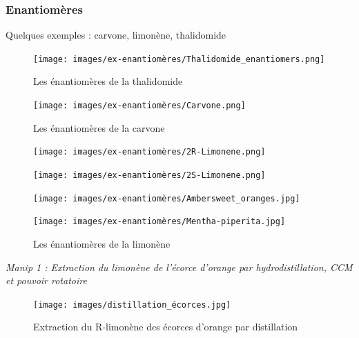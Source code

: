 \documentclass{article}%
\begin{document}
\subsubsection{Enantiomères}


Quelques exemples : carvone, limonène, thalidomide

\begin{figure}
	\centerline{\texttt{[image: images/ex-enantiomères/Thalidomide\_enantiomers.png]}}
	\caption{Les énantiomères de la thalidomide}
\end{figure}


\begin{figure}
	\centerline{\texttt{[image: images/ex-enantiomères/Carvone.png]}}
	\caption{Les énantiomères de la carvone}
\end{figure}


\begin{figure}
	\begin{minipage}[t]{0,5\textwidth}
		\texttt{[image: images/ex-enantiomères/2R-Limonene.png]}
\end{minipage}
	\begin{minipage}[t]{0,5\textwidth}
		\texttt{[image: images/ex-enantiomères/2S-Limonene.png]}
\end{minipage}

\begin{minipage}[t]{0,5\textwidth}
	\texttt{[image: images/ex-enantiomères/Ambersweet\_oranges.jpg]}
\end{minipage}
\begin{minipage}[t]{0,5\textwidth}
	\texttt{[image: images/ex-enantiomères/Mentha-piperita.jpg]}
\end{minipage}

\caption{Les énantiomères de la limonène}
\end{figure}


\textit{Manip 1 : Extraction du limonène de l’écorce d’orange par hydrodistillation, CCM et pouvoir rotatoire}

\begin{figure}
	\centerline{\texttt{[image: images/distillation\_écorces.jpg]}}
	\caption{Extraction du R-limonène des écorces d'orange par distillation}
\end{figure}
\end{document}
